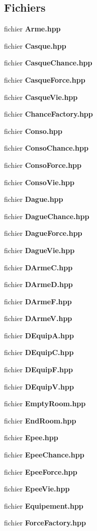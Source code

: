 \subsection*{Fichiers}
\begin{DoxyCompactItemize}
\item 
fichier {\bf Arme.\-hpp}
\item 
fichier {\bf Casque.\-hpp}
\item 
fichier {\bf Casque\-Chance.\-hpp}
\item 
fichier {\bf Casque\-Force.\-hpp}
\item 
fichier {\bf Casque\-Vie.\-hpp}
\item 
fichier {\bf Chance\-Factory.\-hpp}
\item 
fichier {\bf Conso.\-hpp}
\item 
fichier {\bf Conso\-Chance.\-hpp}
\item 
fichier {\bf Conso\-Force.\-hpp}
\item 
fichier {\bf Conso\-Vie.\-hpp}
\item 
fichier {\bf Dague.\-hpp}
\item 
fichier {\bf Dague\-Chance.\-hpp}
\item 
fichier {\bf Dague\-Force.\-hpp}
\item 
fichier {\bf Dague\-Vie.\-hpp}
\item 
fichier {\bf D\-Arme\-C.\-hpp}
\item 
fichier {\bf D\-Arme\-D.\-hpp}
\item 
fichier {\bf D\-Arme\-F.\-hpp}
\item 
fichier {\bf D\-Arme\-V.\-hpp}
\item 
fichier {\bf D\-Equip\-A.\-hpp}
\item 
fichier {\bf D\-Equip\-C.\-hpp}
\item 
fichier {\bf D\-Equip\-F.\-hpp}
\item 
fichier {\bf D\-Equip\-V.\-hpp}
\item 
fichier {\bf Empty\-Room.\-hpp}
\item 
fichier {\bf End\-Room.\-hpp}
\item 
fichier {\bf Epee.\-hpp}
\item 
fichier {\bf Epee\-Chance.\-hpp}
\item 
fichier {\bf Epee\-Force.\-hpp}
\item 
fichier {\bf Epee\-Vie.\-hpp}
\item 
fichier {\bf Equipement.\-hpp}
\item 
fichier {\bf Force\-Factory.\-hpp}
\item 

\end{DoxyCompactItemize}

